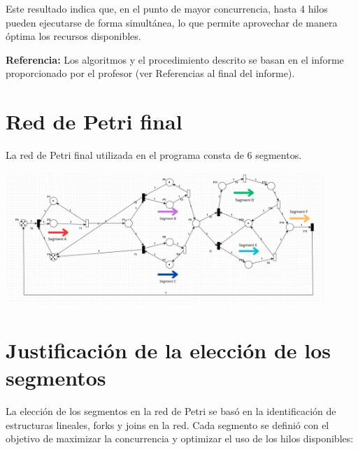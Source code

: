 \documentclass[12pt]{article}
\begin{document}
Este resultado indica que, en el punto de mayor concurrencia, hasta 4 hilos pueden ejecutarse de forma simultánea, lo que permite aprovechar de manera óptima los recursos disponibles.

\vspace{1em}
\textbf{Referencia:} Los algoritmos y el procedimiento descrito se basan en el informe proporcionado por el profesor (ver Referencias al final del informe).

\newpage

\section{Red de Petri final}

La red de Petri final utilizada en el programa consta de 6 segmentos.
\begin{center}
    \includegraphics[width=0.9\textwidth]{Petri-Net-Final.jpeg}
\end{center}

\section{Justificación de la elección de los segmentos}

La elección de los segmentos en la red de Petri se basó en la identificación de estructuras lineales, forks y joins en la red. Cada segmento se definió con el objetivo de maximizar la concurrencia y optimizar el uso de los hilos disponibles:
\end{document}
